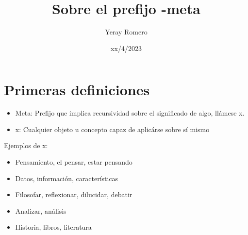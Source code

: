 \documentclass{article}
\title{Sobre el prefijo -meta}
\date{xx/4/2023}
\author{Yeray Romero}
\begin{document}
\maketitle

\section{Primeras definiciones}
\begin{itemize}
\item Meta: Prefijo que implica recursividad sobre el significado de algo, llámese x.
\item x: Cualquier objeto u concepto capaz de aplicárse sobre sí mismo
\end{itemize}
Ejemplos de x:
\begin{itemize}
\item Pensamiento, el pensar, estar pensando
\item Datos, información, características
\item Filosofar, reflexionar, dilucidar, debatir
\item Analizar, análisis
\item Historia, libros, literatura
\end{itemize}
\end{document}
